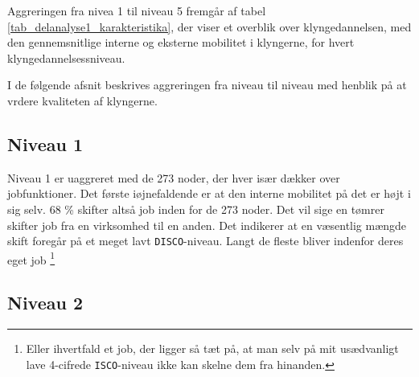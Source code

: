 Aggreringen fra nivea 1 til niveau 5 fremgår af tabel \ref{tab_delanalyse1_karakteristika}, der viser et overblik over klyngedannelsen, med den gennemsnitlige interne og eksterne mobilitet i klyngerne, for hvert klyngedannelsessniveau.
% 
\begin{table}[H] \centering
\caption{Karakteristika for klyngedannelsen}
\label{tab_delanalyse1_karakteristika}
\end{table}
%
I de følgende afsnit beskrives aggreringen fra niveau til niveau med henblik på at vrdere kvaliteten af klyngerne.


\subsection{Niveau 1}

Niveau 1 er uaggreret med de 273 noder, der hver især dækker over jobfunktioner. Det første iøjnefaldende er at den interne mobilitet på det er højt i sig selv. 68 \% skifter altså job inden for de 273 noder. Det vil sige en tømrer skifter job fra en virksomhed til en anden. Det indikerer at en væsentlig mængde skift foregår på et meget lavt \texttt{DISCO}-niveau. Langt de fleste bliver indenfor deres eget job%
%
\footnote{Eller ihvertfald et job, der ligger så tæt på, at man selv på mit usædvanligt lave 4-cifrede \texttt{ISCO}-niveau ikke kan skelne dem fra hinanden.}%
%


\newpage \subsection{Niveau 2}


